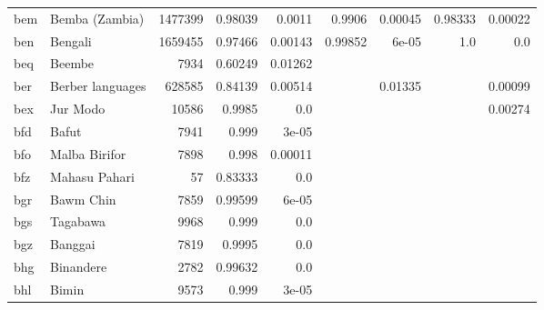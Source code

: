 \documentclass[11pt]{article}
\begin{document}
\begin{table*}[ht]
{\begin{tabular}{llrrrrrrr}
bem         & Bemba (Zambia)         & 1477399         & 0.98039         & 0.0011         & 0.9906         & 0.00045         & 0.98333         & 0.00022         \\

ben         & Bengali         & 1659455         & 0.97466         & 0.00143         & 0.99852         & 6e-05         & 1.0         & 0.0         \\

beq         & Beembe         & 7934         & 0.60249         & 0.01262         &          &          &          &          \\

ber         & Berber languages         & 628585         & 0.84139         & 0.00514         &          & 0.01335         &          & 0.00099         \\

bex         & Jur Modo         & 10586         & 0.9985         & 0.0         &          &          &          & 0.00274         \\

bfd         & Bafut         & 7941         & 0.999         & 3e-05         &          &          &          &          \\

bfo         & Malba Birifor         & 7898         & 0.998         & 0.00011         &          &          &          &          \\

bfz         & Mahasu Pahari         & 57         & 0.83333         & 0.0         &          &          &          &          \\

bgr         & Bawm Chin         & 7859         & 0.99599         & 6e-05         &          &          &          &          \\

bgs         & Tagabawa         & 9968         & 0.999         & 0.0         &          &          &          &          \\

bgz         & Banggai         & 7819         & 0.9995         & 0.0         &          &          &          &          \\

bhg         & Binandere         & 2782         & 0.99632         & 0.0         &          &          &          &          \\

bhl         & Bimin         & 9573         & 0.999         & 3e-05         &          &          &          &          \\


\end{tabular}}
\end{table*}
\end{document}
